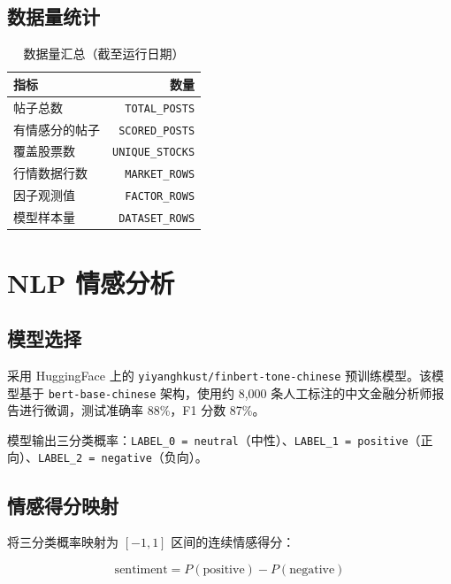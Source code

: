 \documentclass[12pt,a4paper]{ctexart}
\begin{document}
\subsection{数据量统计}

\begin{table}[H]
    \centering
    \caption{数据量汇总（截至运行日期）}
    \begin{tabular}{@{}lr@{}}
        \toprule
        \textbf{指标} & \textbf{数量} \\
        \midrule
        帖子总数 & \texttt{TOTAL\_POSTS} \\
        有情感分的帖子 & \texttt{SCORED\_POSTS} \\
        覆盖股票数 & \texttt{UNIQUE\_STOCKS} \\
        行情数据行数 & \texttt{MARKET\_ROWS} \\
        因子观测值 & \texttt{FACTOR\_ROWS} \\
        模型样本量 & \texttt{DATASET\_ROWS} \\
        \bottomrule
    \end{tabular}
\end{table}

\newpage

\section{NLP 情感分析}

\subsection{模型选择}

采用 HuggingFace 上的 \texttt{yiyanghkust/finbert-tone-chinese} 预训练模型。该模型基于 \texttt{bert-base-chinese} 架构，使用约 8,000 条人工标注的中文金融分析师报告进行微调，测试准确率 88\%，F1 分数 87\%。

模型输出三分类概率：\texttt{LABEL\_0 = neutral}（中性）、\texttt{LABEL\_1 = positive}（正向）、\texttt{LABEL\_2 = negative}（负向）。

\subsection{情感得分映射}

将三分类概率映射为 $[-1, 1]$ 区间的连续情感得分：

\begin{equation}
    \text{sentiment} = P(\text{positive}) - P(\text{negative})
\end{equation}
\end{document}
